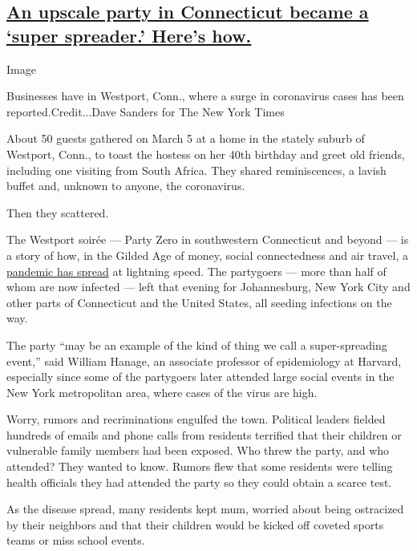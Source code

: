 \hypertarget{an-upscale-party-in-connecticut-became-a-super-spreader-heres-how}{%
\subsection{\texorpdfstring{\protect\hyperlink{an-upscale-party-in-connecticut-became-a-super-spreader-heres-how}{An
upscale party in Connecticut became a `super spreader.' Here's
how.}}{An upscale party in Connecticut became a `super spreader.' Here's how.}}\label{an-upscale-party-in-connecticut-became-a-super-spreader-heres-how}}

Image

Businesses have in Westport, Conn., where a surge in coronavirus cases
has been reported.Credit...Dave Sanders for The New York Times

About 50 guests gathered on March 5 at a home in the stately suburb of
Westport, Conn., to toast the hostess on her 40th birthday and greet old
friends, including one visiting from South Africa. They shared
reminiscences, a lavish buffet and, unknown to anyone, the coronavirus.

Then they scattered.

The Westport soirée --- Party Zero in southwestern Connecticut and
beyond --- is a story of how, in the Gilded Age of money, social
connectedness and air travel, a
\href{https://www.nytimes.com/interactive/2020/world/coronavirus-maps.html}{pandemic
has spread} at lightning speed. The partygoers --- more than half of
whom are now infected --- left that evening for Johannesburg, New York
City and other parts of Connecticut and the United States, all seeding
infections on the way.

The party ``may be an example of the kind of thing we call a
super-spreading event,'' said William Hanage, an associate professor of
epidemiology at Harvard, especially since some of the partygoers later
attended large social events in the New York metropolitan area, where
cases of the virus are high.

Worry, rumors and recriminations engulfed the town. Political leaders
fielded hundreds of emails and phone calls from residents terrified that
their children or vulnerable family members had been exposed. Who threw
the party, and who attended? They wanted to know. Rumors flew that some
residents were telling health officials they had attended the party so
they could obtain a scarce test.

As the disease spread, many residents kept mum, worried about being
ostracized by their neighbors and that their children would be kicked
off coveted sports teams or miss school events.

